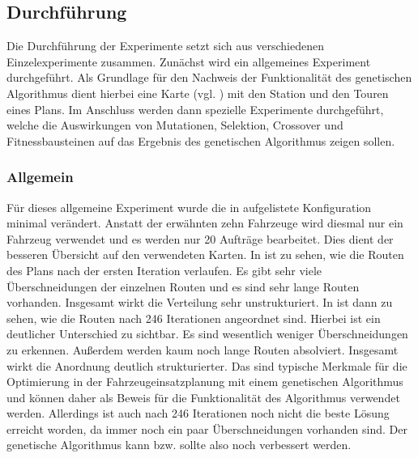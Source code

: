 \subsection{Durchführung}
\label{sec:Durchfuerhung}
Die Durchführung der Experimente setzt sich aus verschiedenen Einzelexperimente zusammen. Zunächst wird ein allgemeines Experiment durchgeführt. Als Grundlage für den Nachweis der Funktionalität des genetischen Algorithmus dient hierbei eine Karte (vgl. ) mit den Station und den Touren eines Plans. Im Anschluss werden dann spezielle Experimente durchgeführt, welche die Auswirkungen von Mutationen, Selektion, Crossover und Fitnessbausteinen auf das Ergebnis des genetischen Algorithmus zeigen sollen.

\subsubsection{Allgemein}
\label{sec:Allgemein}
Für dieses allgemeine Experiment wurde die in  aufgelistete Konfiguration minimal verändert. Anstatt der erwähnten zehn Fahrzeuge wird diesmal nur ein Fahrzeug verwendet und es werden nur 20 Aufträge bearbeitet. Dies dient der besseren Übersicht auf den verwendeten Karten. In  ist zu sehen, wie die Routen des Plans nach der ersten Iteration verlaufen. Es gibt sehr viele Überschneidungen der einzelnen Routen und es sind sehr lange Routen vorhanden. Insgesamt wirkt die Verteilung sehr unstrukturiert. In  ist dann zu sehen, wie die Routen nach 246 Iterationen angeordnet sind. Hierbei ist ein deutlicher Unterschied zu  sichtbar. Es sind wesentlich weniger Überschneidungen zu erkennen. Außerdem werden kaum noch lange Routen absolviert. Insgesamt wirkt die Anordnung deutlich strukturierter. Das sind typische Merkmale für die Optimierung in der Fahrzeugeinsatzplanung mit einem genetischen Algorithmus und können daher als Beweis für die Funktionalität des Algorithmus verwendet werden. Allerdings ist auch nach 246 Iterationen noch nicht die beste Lösung erreicht worden, da immer noch ein paar Überschneidungen vorhanden sind. Der genetische Algorithmus kann bzw. sollte also noch verbessert werden.


